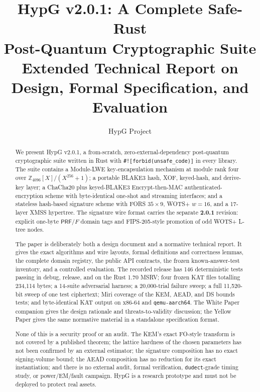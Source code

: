 \documentclass[runningheads]{llncs}
\newcommand{\Z}{\mathbb{Z}}
\newcommand{\PRF}{\mathsf{PRF}}
\begin{document}
\setcounter{tocdepth}{1}

\title{\textbf{HypG v2.0.1: A Complete Safe-Rust\\
Post-Quantum Cryptographic Suite}\\[0.5ex]
\large Extended Technical Report on\\
Design, Formal Specification, and Evaluation}
\author{HypG Project}
\let\hypgorigaddcontentsline\addcontentsline
\renewcommand{\addcontentsline}[3]{}
\maketitle
\let\addcontentsline\hypgorigaddcontentsline

\begin{abstract}
We present HypG v2.0.1, a from-scratch, zero-external-dependency
post-quantum cryptographic suite written in Rust with
\texttt{\#![forbid(unsafe\_code)]} in every library.  The suite contains
a Module-LWE key-encapsulation mechanism at module rank four over
$\Z_{4096}[X]/(X^{256}+1)$; a portable BLAKE3 hash, XOF, keyed-hash, and
derive-key layer; a ChaCha20 plus keyed-BLAKE3 Encrypt-then-MAC
authenticated-encryption scheme with byte-identical one-shot and
streaming interfaces; and a stateless hash-based signature scheme with
FORS $35\times 9$, WOTS+ $w=16$, and a 17-layer XMSS hypertree.  The
signature wire format carries the separate \textbf{2.0.1} revision:
explicit one-byte $\PRF$/$F$ domain tags and FIPS-205-style promotion of
odd WOTS+ L-tree nodes.

The paper is deliberately both a design document and a normative
technical report.  It gives the exact algorithms and wire layouts,
formal definitions and correctness lemmas, the complete domain registry,
the public API contracts, the frozen known-answer-test inventory, and a
controlled evaluation.  The recorded release has 146 deterministic
tests passing in debug, release, and on the Rust 1.70 MSRV; four frozen
KAT files totalling 234,114 bytes; a 14-suite adversarial harness; a
20,000-trial failure sweep; a full 11,520-bit sweep of one test
ciphertext; Miri coverage of the KEM, AEAD, and DS bounds tests; and
byte-identical KAT output on x86-64 and \texttt{qemu-aarch64}.  The
White Paper companion gives the design rationale and threats-to-validity
discussion; the Yellow Paper gives the same normative material in a
standalone specification format.

None of this is a security proof or an audit.  The KEM's exact FO-style
transform is not covered by a published theorem; the lattice hardness of
the chosen parameters has not been confirmed by an external estimator;
the signature composition has no exact signing-volume bound; the AEAD
composition has no reduction for its exact instantiation; and there is
no external audit, formal verification, \texttt{dudect}-grade timing
study, or power/EM/fault campaign.  HypG is a research prototype and
must not be deployed to protect real assets.
\end{abstract}
\end{document}
